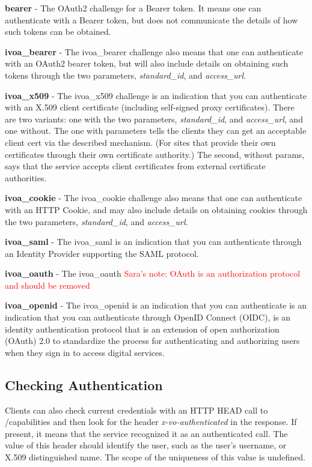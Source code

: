 \documentclass[11pt,a4paper]{ivoa}
\begin{document}
\textbf{bearer} - The OAuth2 \citep{std:RFC6749} challenge for a Bearer
token. It means one can authenticate with a Bearer token, but does not
communicate the details of how such tokens can be obtained.

\textbf{ivoa\_bearer} - The ivoa\_bearer challenge also means that one 
can authenticate with an OAuth2 bearer token, but will also include 
details on obtaining such tokens through the two parameters, 
\emph{standard\_id}, and \emph{access\_url}.

\textbf{ivoa\_x509} - The ivoa\_x509 challenge is an indication that you
can authenticate with an X.509 client certificate (including self-signed
proxy certificates). There are two variants: one with the two
parameters, \emph{standard\_id}, and \emph{access\_url}, and one 
without. The
one with parameters tells the clients they can get an acceptable client
cert via the described mechanism. (For sites that provide their own 
certificates through their own certificate authority.) The second, 
without params, says that the service accepts client certificates from 
external certificate authorities.

\textbf{ivoa\_cookie} - The ivoa\_cookie challenge also means that one can
authenticate with an HTTP Cookie, and may also include details on
obtaining cookies through the two parameters, \emph{standard\_id}, and
\emph{access\_url}.

\textbf{ivoa\_saml} - The ivoa\_saml is an indication that you
can authenticate through an Identity Provider supporting the SAML 
protocol.


\textbf{ivoa\_oauth} - The ivoa\_oauth \textcolor{red}{Sara's note: 
OAuth is an authorization protocol and should be removed}

\textbf{ivoa\_openid} - The ivoa\_openid is an indication that you
can authenticate is an indication that you
can authenticate through OpenID Connect (OIDC), is an identity 
authentication protocol that is an extension of open authorization 
(OAuth) 2.0 to standardize the process for authenticating and authorizing 
users when they sign in to access digital services. 

\subsection{Checking Authentication}

Clients can also check current credentials with an HTTP HEAD call to
/capabilities and then look for the header \emph{x-vo-authenticated} in
the response. If present, it means that the service recognized it as an
authenticated call.  The value of this header should identify the user,
such as the user's username, or X.509 distinguished name.  The scope of
the uniqueness of this value is undefined.
\end{document}
